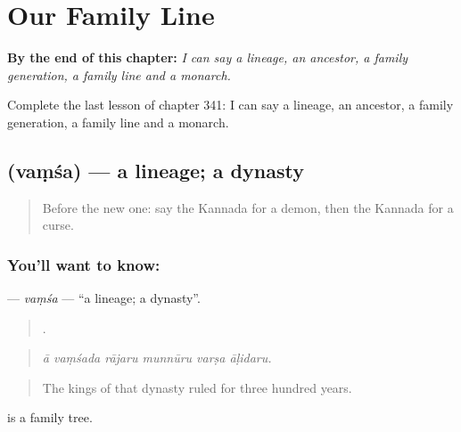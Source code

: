 
\chapter{Our Family Line}
\label{ch:ka-our-family-line}

\begin{chapteropening}
\textbf{By the end of this chapter:} \emph{I can say a lineage, an ancestor, a family generation, a family line and a monarch.}

Complete the last lesson of chapter 341: I can say a lineage, an ancestor, a family generation, a family line and a monarch.
\end{chapteropening}

\section[\texorpdfstring{\kn{ವಂಶ} (vaṃśa)}{ವಂಶ (vaṃśa)}]{ (vaṃśa) — a lineage; a dynasty}

\label{lesson:KA-C341-vamsa}



\begin{quote}
Before the new one: say the Kannada for a demon, then the Kannada for a curse.
\end{quote}

\subsection*{You'll want to know: }
\textbf{} — \emph{vaṃśa} — \textquotedblleft{}a lineage; a dynasty\textquotedblright{}.

\begin{quote}
     .
\end{quote}

\begin{quote}
\emph{ā vaṃśada rājaru munnūru varṣa āḷidaru.}
\end{quote}

\begin{quote}
The kings of that dynasty ruled for three hundred years.
\end{quote}

 is a family tree.

